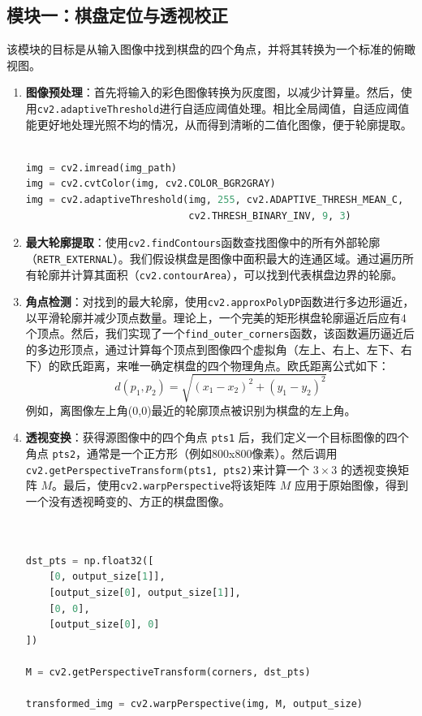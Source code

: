 \documentclass[12pt, a4paper]{article}
\begin{document}
\subsection{模块一：棋盘定位与透视校正}
该模块的目标是从输入图像中找到棋盘的四个角点，并将其转换为一个标准的俯瞰视图。

\begin{enumerate}
    \item \textbf{图像预处理}：首先将输入的彩色图像转换为灰度图，以减少计算量。然后，使用\texttt{cv2.adaptiveThreshold}进行自适应阈值处理。相比全局阈值，自适应阈值能更好地处理光照不均的情况，从而得到清晰的二值化图像，便于轮廓提取。
    \begin{lstlisting}[language=python, caption={图像预处理代码}]

img = cv2.imread(img_path)
img = cv2.cvtColor(img, cv2.COLOR_BGR2GRAY)
img = cv2.adaptiveThreshold(img, 255, cv2.ADAPTIVE_THRESH_MEAN_C,
                            cv2.THRESH_BINARY_INV, 9, 3)
    \end{lstlisting}
    
    \item \textbf{最大轮廓提取}：使用\texttt{cv2.findContours}函数查找图像中的所有外部轮廓（\texttt{RETR\_EXTERNAL}）。我们假设棋盘是图像中面积最大的连通区域。通过遍历所有轮廓并计算其面积（\texttt{cv2.contourArea}），可以找到代表棋盘边界的轮廓。
    
    \item \textbf{角点检测}：对找到的最大轮廓，使用\texttt{cv2.approxPolyDP}函数进行多边形逼近，以平滑轮廓并减少顶点数量。理论上，一个完美的矩形棋盘轮廓逼近后应有4个顶点。然后，我们实现了一个\texttt{find\_outer\_corners}函数，该函数遍历逼近后的多边形顶点，通过计算每个顶点到图像四个虚拟角（左上、右上、左下、右下）的欧氏距离，来唯一确定棋盘的四个物理角点。欧氏距离公式如下：
    \[ d(p_1, p_2) = \sqrt{(x_1 - x_2)^2 + (y_1 - y_2)^2} \]
    例如，离图像左上角(0,0)最近的轮廓顶点被识别为棋盘的左上角。
    
    \item \textbf{透视变换}：获得源图像中的四个角点 \texttt{pts1} 后，我们定义一个目标图像的四个角点 \texttt{pts2}，通常是一个正方形（例如800x800像素）。然后调用\texttt{cv2.getPerspectiveTransform(pts1, pts2)}来计算一个 $3 \times 3$ 的透视变换矩阵 $M$。最后，使用\texttt{cv2.warpPerspective}将该矩阵 $M$ 应用于原始图像，得到一个没有透视畸变的、方正的棋盘图像。
    \begin{lstlisting}[language=python, caption={透视变换核心代码}]


dst_pts = np.float32([
    [0, output_size[1]],          
    [output_size[0], output_size[1]],  
    [0, 0],                     
    [output_size[0], 0]          
])

M = cv2.getPerspectiveTransform(corners, dst_pts) 

transformed_img = cv2.warpPerspective(img, M, output_size)
    \end{lstlisting}
\end{enumerate}
\end{document}
